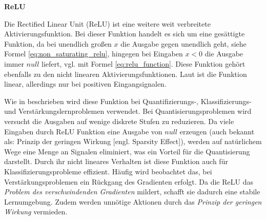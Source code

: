 %
\textbf{ReLU}\vspace{0.2cm}


Die Rectified Linear Unit (ReLU) ist eine weitere weit verbreitete Aktivierungsfunktion. Bei dieser Funktion handelt es sich um eine gesättigte Funktion, da bei unendlich großen $x$ die Ausgabe gegen unendlich geht, siehe Formel \ref{eq:non_saturating_relu}, hingegen bei Eingaben $x < 0$ die Ausgabe immer $null$ liefert, vgl. mit Formel \ref{eq:relu_function}. Diese Funktion gehört ebenfalls zu den nicht linearen Aktivierungsfunktionen. Laut \cite{yuen_universal_2021} ist die Funktion linear, allerdings nur bei positiven Eingangsignalen.\vspace{0.2cm}


Wie in \cite{yuen_universal_2021} beschrieben wird diese Funktion bei Quantifizierungs-, Klassifizierungs- und Verstärkungslernproblemen verwendet. Bei Quantisierungsproblemen wird versucht die Ausgaben auf wenige diskrete Stufen zu reduzieren. Da viele Eingaben durch ReLU Funktion eine Ausgabe von $null$ erzeugen (auch bekannt als: Prinzip der geringen Wirkung [engl. Sparsity Effect]), werden auf natürlichem Wege eine Menge an Signalen eliminiert, was ein Vorteil für die Quantisierung darstellt. Durch ihr nicht lineares Verhalten ist diese Funktion auch für Klassifizierungsprobleme effizient. Häufig wird beobachtet das, bei Verstärkungsproblemen ein Rückgang des Gradienten erfolgt. Da die ReLU das \textit{Problem des verschwindenden Gradienten} mildert, schafft sie dadurch eine stabile Lernumgebung. Zudem werden unnötige Aktionen durch das \textit{Prinzip der geringen Wirkung} vermieden.


